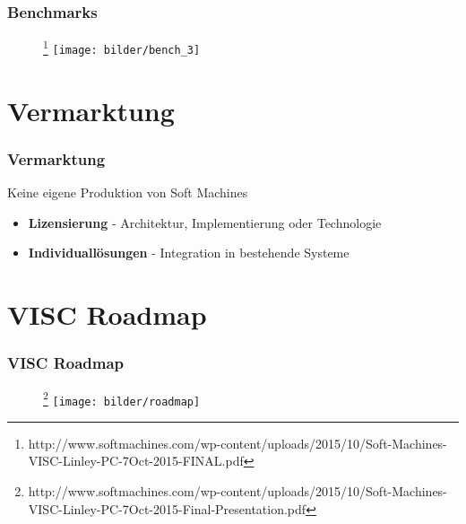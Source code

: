 \documentclass[xcolor=dvipsnames]{beamer}
\begin{document}
\begin{frame}
\frametitle{Benchmarks}
	\begin{center}
	\begin{figure}
	\footnote{http://www.softmachines.com/wp-content/uploads/2015/10/Soft-Machines-VISC-Linley-PC-7Oct-2015-FINAL.pdf}
\texttt{[image: bilder/bench\_3]}
\end{figure}
	\end{center}
\end{frame}

	
\section{Vermarktung}	
\begin{frame}
	\frametitle{Vermarktung}
	Keine eigene Produktion von Soft Machines
	\begin{itemize}
		\item \textbf{Lizensierung} - Architektur, Implementierung oder Technologie
		\item \textbf{Individuallösungen} - Integration in bestehende Systeme 
	\end{itemize}
	
\end{frame}

\section{VISC Roadmap}
	\begin{frame}
		\frametitle{VISC Roadmap}
	\begin{figure}\footnote{http://www.softmachines.com/wp-content/uploads/2015/10/Soft-Machines-VISC-Linley-PC-7Oct-2015-Final-Presentation.pdf}
\texttt{[image: bilder/roadmap]}
\end{figure}
	\end{frame}
	
\end{document}
